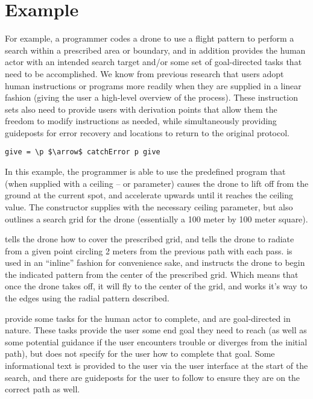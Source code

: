\documentclass{sig-alternate-05-2015}
\begin{document}

\section{Example}
\label{sec:example}

For example, a programmer codes a drone to use a flight pattern to perform
a search within a prescribed area or boundary, and in addition provides the
human actor with an intended search target and/or some set of goal-directed
tasks that need to be accomplished. We know from previous research
\cite{ABW15prog} that users adopt human instructions or programs more
readily when they are supplied in a linear fashion (giving the user a
high-level overview of the process). These instruction sets also need to
provide users with derivation points that allow them the freedom to modify
instructions as needed, while simultaneously providing guideposts for error
recovery and locations to return to the original protocol.

\begin{lstlisting}[breaklines=true]
give = \p $\arrow$ catchError p give
\end{lstlisting}

In this example, the programmer is able to use the predefined 
program that (when supplied with a ceiling -- or  parameter) causes
the drone to lift off from the ground at the current spot, and accelerate
upwards until it reaches the ceiling value. The  constructor
supplies  with the necessary ceiling parameter, but also
outlines a search grid for the drone (essentially a 100 meter by 100 meter
square).

 tells the drone how to cover the prescribed grid, and
 tells the drone to radiate from a given point circling
2 meters from the previous path with each pass.  is used in
an ``inline'' fashion for convenience sake, and instructs the drone to begin
the indicated pattern from the center of the prescribed grid. Which means that
once the drone takes off, it will fly to the center of the grid, and works
it's way to the edges using the radial pattern described.

 provide some tasks for the human actor to complete, and
are goal-directed in nature. These tasks provide the user some end goal they
need to reach (as well as some potential guidance if the user encounters
trouble or diverges from the initial path), but does not specify for the user
how to complete that goal. Some informational text is provided to the user via
the user interface at the start of the search, and there are guideposts for
the user to follow to ensure they are on the correct path as well.
\end{document}
